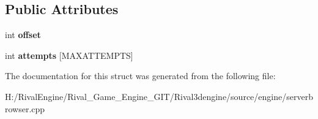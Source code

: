 \subsection*{Public Attributes}
\begin{DoxyCompactItemize}
\item 
\mbox{\label{structpingattempts_a26d6c7d67126c0f32a5f84ea8e3e5c5d}} 
int {\bfseries offset}
\item 
\mbox{\label{structpingattempts_a19e6b33936169383fd012d900d50dfaa}} 
int {\bfseries attempts} \mbox{[}M\+A\+X\+A\+T\+T\+E\+M\+P\+TS\mbox{]}
\end{DoxyCompactItemize}


The documentation for this struct was generated from the following file\+:\begin{DoxyCompactItemize}
\item 
H\+:/\+Rival\+Engine/\+Rival\+\_\+\+Game\+\_\+\+Engine\+\_\+\+G\+I\+T/\+Rival3dengine/source/engine/serverbrowser.\+cpp\end{DoxyCompactItemize}
